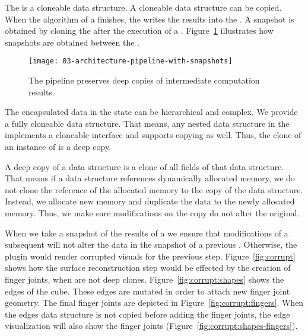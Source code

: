 \documentclass[../../ClassicThesis.tex]{subfiles}
\begin{document}
The  is a cloneable data structure. A cloneable
data structure can be copied. When the algorithm of a
 finishes, the  writes the results
into the . A snapshot is obtained by cloning the
 after the execution of a .
Figure~\ref{fig:pipeline-with-snapshots} illustrates how snapshots are
obtained between the .

\begin{figure}[h]
  \centering
  \texttt{[image: 03-architecture-pipeline-with-snapshots]}
  \caption{The pipeline preserves deep copies of intermediate computation results.}
  \label{fig:pipeline-with-snapshots}
\end{figure}


The encapsulated data in the state can be hierarchical and complex. We
provide a fully cloneable data structure. That means, any nested data
structure in the  implements a cloneable
interface and supports copying as well. Thus, the clone of an instance
of  is a deep copy.

A deep copy of a data structure is a
clone of all fields of that data structure. That means if a
data structure references dynamically allocated memory, we
do not clone the reference of the allocated memory to the
copy of the data structure. Instead, we allocate new memory
and duplicate the data to the newly allocated memory. Thus,
we make sure modifications on the copy do not alter the
original.

When we take a snapshot of the results of a
 we ensure that modifications of a
subsequent  will not alter the data in
the snapshot of a previous . Otherwise,
the  plugin would render corrupted
visuals for the previous step. Figure~\ref{fig:corrupt}
shows how the surface reconstruction step would be effected
by the creation of finger joints, when 
are not deep clones. Figure~\ref{fig:corrupt:shapes} shows
the edges of the cube. These edges are mutated in order to
attach new finger joint geometry. The final finger joints
are depicted in Figure~\ref{fig:corrupt:fingers}. When the
edges data structure is not copied before adding the finger
joints, the edge visualization will also show the finger joints
(Figure~\ref{fig:corrupt:shapes-fingers}).
\end{document}
